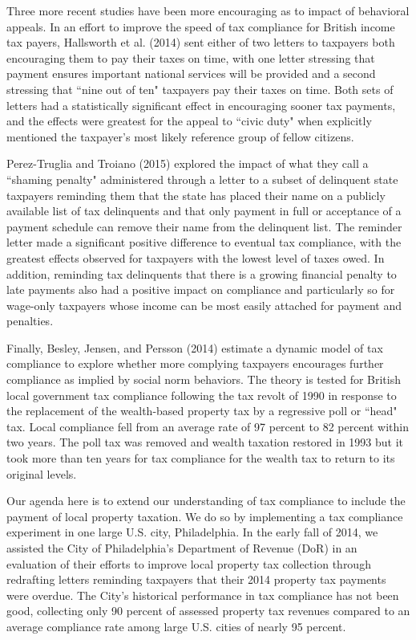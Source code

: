 \documentclass[12pt,titlepage]{article}
\begin{document}
Three more recent studies have been more encouraging as to impact of
behavioral appeals. In an effort to improve the speed of tax
compliance for British income tax payers, Hallsworth et al. (2014)
sent either of two letters to taxpayers both encouraging them to pay
their taxes on time, with one letter stressing that payment ensures
important national services will be provided and a second stressing
that ``nine out of ten" taxpayers pay their taxes on time.  Both sets
of letters had a statistically significant effect in encouraging
sooner tax payments, and the effects were greatest for the appeal to
``civic duty" when explicitly mentioned the taxpayer's most likely
reference group of fellow citizens.

Perez-Truglia and Troiano (2015) explored the impact of what they call
a ``shaming penalty" administered through a letter to a subset of
delinquent state taxpayers reminding them that the state has placed
their name on a publicly available list of tax delinquents and that
only payment in full or acceptance of a payment schedule can remove
their name from the delinquent list.  The reminder letter made a
significant positive difference to eventual tax compliance, with the
greatest effects observed for taxpayers with the lowest level of taxes
owed.  In addition, reminding tax delinquents that there is a growing
financial penalty to late payments also had a positive impact on
compliance and particularly so for wage-only taxpayers whose income
can be most easily attached for payment and penalties.

Finally, Besley, Jensen, and Persson (2014) estimate a dynamic model
of tax compliance to explore whether more complying taxpayers
encourages further compliance as implied by social norm behaviors.
The theory is tested for British local government tax compliance
following the tax revolt of 1990 in response to the replacement of the
wealth-based property tax by a regressive poll or ``head" tax.  Local
compliance fell from an average rate of 97 percent to 82 percent
within two years.  The poll tax was removed and wealth taxation
restored in 1993 but it took more than ten years for tax compliance
for the wealth tax to return to its original levels.

Our agenda here is to extend our understanding of tax compliance to
include the payment of local property taxation.  We do so by
implementing a tax compliance experiment in one large U.S. city,
Philadelphia.  In the early fall of 2014, we assisted the City of
Philadelphia's Department of Revenue (DoR) in an evaluation
of their efforts to improve local property tax collection through
redrafting letters reminding taxpayers that their 2014 property tax
payments were overdue.  The City's historical performance in tax
compliance has not been good, collecting only 90 percent of assessed
property tax revenues compared to an average compliance rate among
large U.S. cities of nearly 95 percent.
\end{document}

